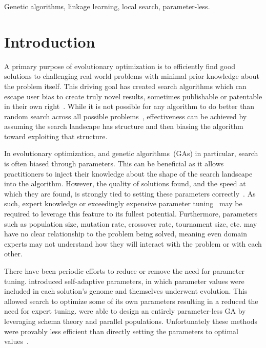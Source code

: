 \documentclass[twoside]{article}
\begin{document}
\begin{keywords}

Genetic algorithms, 
linkage learning,
local search,
parameter-less.

\end{keywords}

\section{Introduction}
A primary purpose of evolutionary optimization is to efficiently find good solutions
to challenging real world problems with minimal prior knowledge about the problem itself.
This driving goal has created search algorithms which can escape user bias to create
truly novel results, sometimes publishable or patentable in their own right~\citep{kannappan:2014:humies}.
While it is not possible for any algorithm to do better than random search across all possible
problems~\citep{Wolpert:1997:nfl}, effectiveness can be achieved by assuming the search
landscape has structure and then biasing the algorithm toward exploiting that structure.

In evolutionary optimization, and genetic algorithms~(GAs) in particular, search is often
biased through parameters. This can be beneficial as it allows practitioners to inject their
knowledge about the shape of the search landscape into the algorithm.
However, the quality of solutions found, and the speed at which they are found, is strongly tied to setting these parameters
correctly~\citep{goldberg:1991:gasize}. As such, expert knowledge or exceedingly
expensive parameter tuning~\citep{grefenstette:1986:optimalga} may be required to leverage
this feature to its fullest potential. Furthermore,  parameters such as population size, mutation rate, crossover
rate, tournament size, etc. may have no clear relationship to the problem being solved, meaning even
domain experts may not understand how they will interact with the problem or with each other.

There have been periodic efforts to reduce or remove the need for parameter tuning.
\cite{Back:1992:selfadapt} introduced self-adaptive parameters, in which parameter values
were included in each solution's genome and themselves underwent evolution. This allowed search
to optimize some of its own parameters resulting in a reduced the need for expert tuning.
\cite{harik:1999:parameterlessga} were able to design an entirely parameter-less GA by
leveraging schema theory and parallel populations. Unfortunately these methods were provably less efficient
than directly setting the parameters to optimal values~\citep{pelikan:1999:worstparameter-less}.
\end{document}
